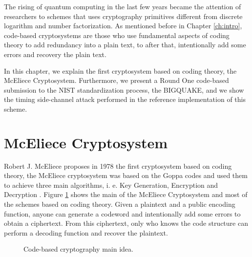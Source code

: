 The rising of quantum computing in the last few years became the attention of researchers to schemes that uses cryptography primitives different from discrete logarithm and number factorization. As mentioned before in Chapter \ref{ch:intro}, code-based cryptosystems are those who use fundamental aspects of coding theory to add redundancy into a plain text, to after that, intentionally add some errors and recovery the plain text. 

In this chapter, we explain the first cryptosystem based on coding theory, the McEliece Cryptosystem. Furthermore, we present a Round One code-based submission to the NIST standardization process, the BIGQUAKE, and we show the timing side-channel attack performed in the reference implementation of this scheme.

\section{McEliece Cryptosystem}
Robert J. McEliece proposes in 1978 the first cryptosystem based on coding theory, the McEliece cryptosystem was based on the Goppa codes and used them to achieve three main algorithms, i. e. Key Generation, Encryption and Decryption \cite{mceliece1978public}. Figure \ref{fig:code-idea} shows the main of the McEliece Cryptosystem and most of the schemes based on coding theory. Given a plaintext and a public encoding function, anyone can generate a codeword and intentionally add some errors to obtain a ciphertext. From this ciphertext, only who knows the code structure can perform a decoding function and recover the plaintext.


\begin{figure}
    \centering
    \label{fig:code-idea}
    \caption{Code-based cryptography main idea.}
\end{figure}

